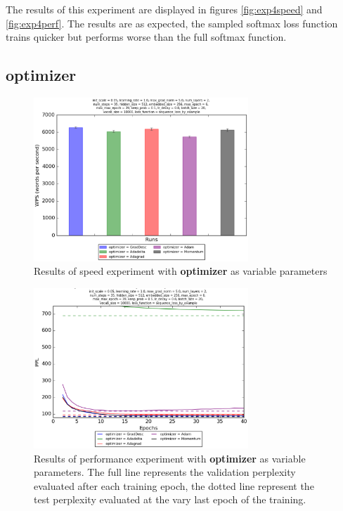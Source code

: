 \documentclass[10pt,a4paper,titlepage]{article}
\begin{document}
The results of this experiment are displayed in figures \ref{fig:exp4speed} and \ref{fig:exp4perf}. The results are as expected, the sampled softmax loss function trains quicker but performs worse than the full softmax function.

\subsection{optimizer}

\begin{figure}[H]
	\begin{center}
		\includegraphics[width=0.72\textwidth]{optspeed.eps}
		\caption{Results of speed experiment with \textbf{optimizer} as variable parameters}
		\label{fig:exp5speed}
	\end{center}	
\end{figure}

\begin{figure}[H]
	\begin{center}
		\includegraphics[width=0.72\textwidth]{optperf.eps}
		\caption{Results of performance experiment with \textbf{optimizer} as variable parameters. The full line represents the validation perplexity evaluated after each training epoch, the dotted line represent the test perplexity evaluated at the vary last epoch of the training.}
		\label{fig:exp5perf}
	\end{center}	
\end{figure}
\end{document}
